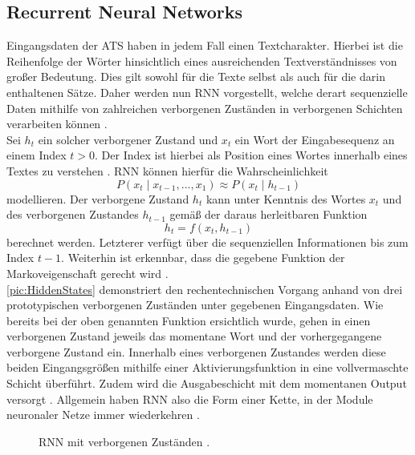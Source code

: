 \subsection{Recurrent Neural Networks}
\noindent
Eingangsdaten der \ac{ATS} haben in jedem Fall einen Textcharakter. Hierbei ist die Reihenfolge der Wörter hinsichtlich eines ausreichenden Textverständnisses von großer Bedeutung. Dies gilt sowohl für die Texte selbst als auch für die darin enthaltenen Sätze. Daher werden nun \ac{RNN} vorgestellt, welche derart sequenzielle Daten mithilfe von zahlreichen verborgenen Zuständen in verborgenen Schichten verarbeiten können \cite[S.~301]{ZHA20}.\\

\noindent
Sei $h_t$ ein solcher verborgener Zustand und $x_t$ ein Wort der Eingabesequenz an einem Index $t > 0$. Der Index ist hierbei als Position eines Wortes innerhalb eines Textes zu verstehen \cite{VAS17}. \ac{RNN} können hierfür die Wahrscheinlichkeit $$P(x_t \mid x_{t-1}, ... , x_1) \approx P(x_t \mid h_{t-1})$$ modellieren. Der verborgene Zustand $h_t$ kann unter Kenntnis des Wortes $x_t$ und des verborgenen Zustandes $h_{t-1}$ gemäß der daraus herleitbaren Funktion $$h_t = f(x_t, h_{t-1})$$ berechnet werden. Letzterer verfügt über die sequenziellen Informationen bis zum Index $t-1$. Weiterhin ist erkennbar, dass die gegebene Funktion der Markoveigenschaft gerecht wird \cite[S.~323-324]{ZHA20}.\\

\noindent
\autoref{pic:HiddenStates} demonstriert den rechentechnischen Vorgang anhand von drei prototypischen verborgenen Zuständen unter gegebenen Eingangsdaten. Wie bereits bei der oben genannten Funktion ersichtlich wurde, gehen in einen verborgenen Zustand jeweils das momentane Wort und der vorhergegangene verborgene Zustand ein. Innerhalb eines verborgenen Zustandes werden diese beiden Eingangsgrößen mithilfe einer Aktivierungsfunktion in eine vollvermaschte Schicht überführt. Zudem wird die Ausgabeschicht mit dem momentanen Output versorgt \cite[S.~325]{ZHA20}. Allgemein haben \ac{RNN} also die Form einer Kette, in der Module neuronaler Netze immer wiederkehren \cite{AIU19}.

\begin{figure}[h!]
  \centering
  \caption{RNN mit verborgenen Zuständen \cite[S.~325]{ZHA20}.}
  \label{pic:HiddenStates}
\end{figure}

